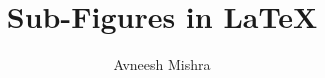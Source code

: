 

\title{Sub-Figures in \LaTeX}
\author{Avneesh Mishra}


    \maketitle
    \tableofcontents
    \listoffigures
    \pagebreak
    
    

